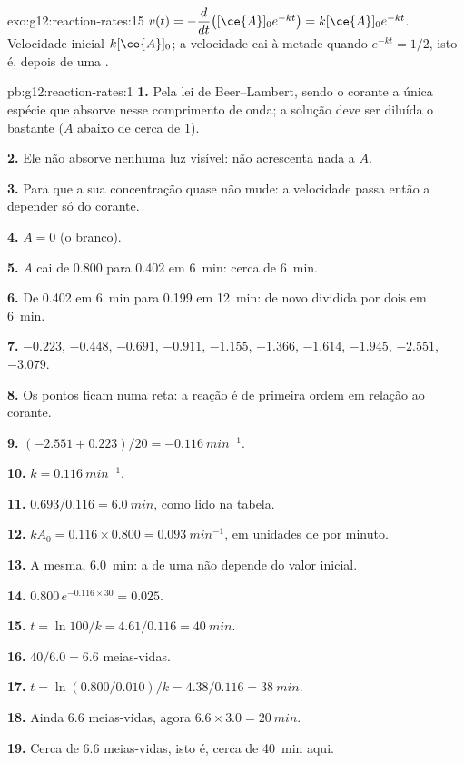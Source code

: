 \begin{solution}{exo:g12:reaction-rates:15}
$v(t) = -\dfrac{d}{dt}\big([\ce{A}]_0 e^{-kt}\big) = k[\ce{A}]_0 e^{-kt}$.
Velocidade inicial $k[\ce{A}]_0$; a velocidade cai à metade quando
$e^{-kt} = 1/2$, isto é, depois de uma .
\end{solution}

\begin{solution}{pb:g12:reaction-rates:1}
\textbf{1.} Pela lei de Beer--Lambert, sendo o corante a única espécie
que absorve nesse comprimento de onda; a solução deve ser diluída o
bastante ($A$ abaixo de cerca de 1).

\textbf{2.} Ele não absorve nenhuma luz visível: não acrescenta nada a
$A$.

\textbf{3.} Para que a sua concentração quase não mude: a velocidade
passa então a depender só do corante.

\textbf{4.} $A = 0$ (o branco).

\textbf{5.} $A$ cai de 0.800 para 0.402 em \qty{6}{min}: cerca de
\qty{6}{min}.

\textbf{6.} De 0.402 em \qty{6}{min} para 0.199 em \qty{12}{min}: de
novo dividida por dois em \qty{6}{min}.

\textbf{7.} $-0.223$, $-0.448$, $-0.691$, $-0.911$, $-1.155$, $-1.366$,
$-1.614$, $-1.945$, $-2.551$, $-3.079$.

\textbf{8.} Os pontos ficam numa reta: a reação é de primeira ordem em
relação ao corante.

\textbf{9.} $(-2.551 + 0.223)/20 = \qty{-0.116}{min^{-1}}$.

\textbf{10.} $k = \qty{0.116}{min^{-1}}$.

\textbf{11.} $0.693 / 0.116 = \qty{6.0}{min}$, como lido na tabela.

\textbf{12.} $k A_0 = 0.116 \times 0.800 = \qty{0.093}{min^{-1}}$, em
unidades de  por minuto.

\textbf{13.} A mesma, \qty{6.0}{min}: a  de uma  não depende do valor inicial.

\textbf{14.} $0.800\, e^{-0.116 \times 30} = 0.025$.

\textbf{15.} $t = \ln 100 / k = 4.61 / 0.116 = \qty{40}{min}$.

\textbf{16.} $40 / 6.0 = 6.6$ meias-vidas.

\textbf{17.} $t = \ln(0.800/0.010)/k = 4.38 / 0.116 = \qty{38}{min}$.

\textbf{18.} Ainda 6.6 meias-vidas, agora
$6.6 \times 3.0 = \qty{20}{min}$.

\textbf{19.} Cerca de 6.6 meias-vidas, isto é, cerca de \qty{40}{min}
aqui.
\end{solution}
